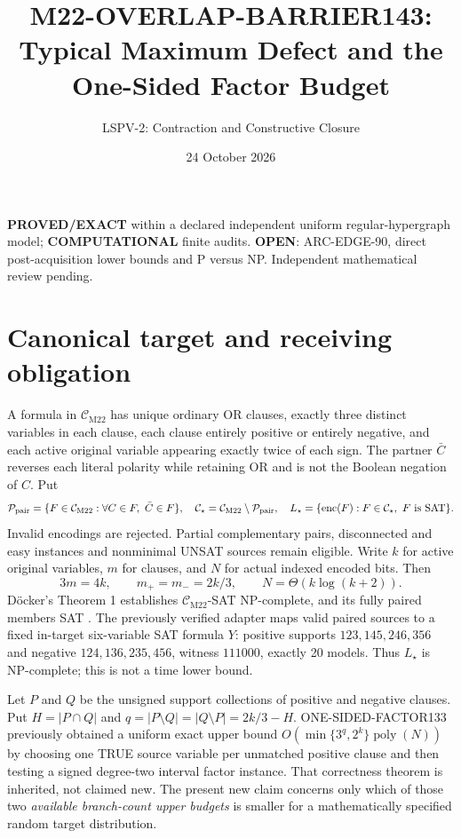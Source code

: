\documentclass[11pt]{article}
\title{M22-OVERLAP-BARRIER143: Typical Maximum Defect and the One-Sided Factor Budget}
\author{LSPV-2: Contraction and Constructive Closure}
\date{24 October 2026}
\newcommand{\CM}{\mathcal C_{\mathrm{M22}}}
\newcommand{\CS}{\mathcal C_{\star}}
\begin{document}
\maketitle
\begin{center}\textbf{PROVED/EXACT} within a declared independent uniform regular-hypergraph model; \textbf{COMPUTATIONAL} finite audits. \textbf{OPEN}: ARC-EDGE-90, direct post-acquisition lower bounds and P versus NP. Independent mathematical review pending.\end{center}

\section{Canonical target and receiving obligation}
A formula in $\CM$ has unique ordinary OR clauses, exactly three distinct variables in each clause, each clause entirely positive or entirely negative, and each active original variable appearing exactly twice of each sign. The partner $\bar C$ reverses each literal polarity while retaining OR and is not the Boolean negation of $C$. Put
\[
\mathcal P_{\rm pair}=\{F\in\CM:\forall C\in F,\ \bar C\in F\},
\quad\CS=\CM\setminus\mathcal P_{\rm pair},\quad
L_\star=\{\operatorname{enc}(F):F\in\CS,\ F\text{ is SAT}\}.
\]
Invalid encodings are rejected. Partial complementary pairs, disconnected and easy instances and nonminimal UNSAT sources remain eligible. Write $k$ for active original variables, $m$ for clauses, and $N$ for actual indexed encoded bits. Then
\[
3m=4k,\qquad m_+=m_-=2k/3,\qquad N=\Theta(k\log(k+2)).
\]
D\"ocker's Theorem 1 establishes $\CM$-SAT NP-complete, and its fully paired members SAT \cite{docker}. The previously verified adapter maps valid paired sources to a fixed in-target six-variable SAT formula $Y$: positive supports $123,145,246,356$ and negative $124,136,235,456$, witness $111000$, exactly 20 models. Thus $L_\star$ is NP-complete; this is not a time lower bound.

Let $P$ and $Q$ be the unsigned support collections of positive and negative clauses. Put $H=|P\cap Q|$ and $q=|P\setminus Q|=|Q\setminus P|=2k/3-H$. ONE-SIDED-FACTOR133 previously obtained a uniform exact upper bound $O(\min\{3^q,2^k\}\operatorname{poly}(N))$ by choosing one TRUE source variable per unmatched positive clause and then testing a signed degree-two interval factor instance. That correctness theorem is inherited, not claimed new. The present new claim concerns only which of those two \emph{available branch-count upper budgets} is smaller for a mathematically specified random target distribution.
\end{document}
